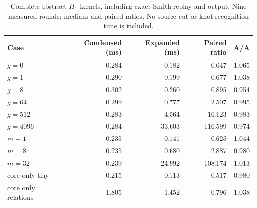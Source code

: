 \begin{table}[ht]
\centering\small
\begin{tabular}{@{}lrrrr@{}}
\toprule
Case & Condensed (ms) & Expanded (ms) & Paired ratio & A/A\\
\midrule
$g=0$ & 0.284 & 0.182 & 0.647 & 1.065 \\
$g=1$ & 0.290 & 0.199 & 0.677 & 1.038 \\
$g=8$ & 0.302 & 0.260 & 0.895 & 0.954 \\
$g=64$ & 0.299 & 0.777 & 2.507 & 0.995 \\
$g=512$ & 0.283 & 4.564 & 16.123 & 0.983 \\
$g=4096$ & 0.284 & 33.603 & 116.599 & 0.974 \\
$m=1$ & 0.235 & 0.141 & 0.625 & 1.044 \\
$m=8$ & 0.235 & 0.680 & 2.887 & 0.980 \\
$m=32$ & 0.239 & 24.992 & 108.174 & 1.013 \\
core only tiny & 0.215 & 0.113 & 0.517 & 0.980 \\
core only relations & 1.805 & 1.452 & 0.796 & 1.038 \\
\bottomrule
\end{tabular}
\caption{Complete abstract $H_1$ kernels, including exact Smith replay and output. Nine measured rounds; medians and paired ratios. No source cut or knot-recognition time is included.}
\label{tab:timings}
\end{table}

